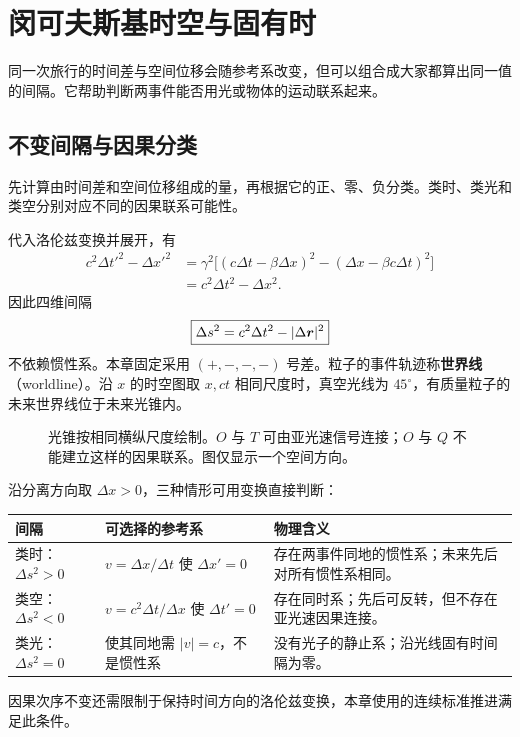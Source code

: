 \section{闵可夫斯基时空与固有时}
同一次旅行的时间差与空间位移会随参考系改变，但可以组合成大家都算出同一值的间隔。它帮助判断两事件能否用光或物体的运动联系起来。

\subsection{不变间隔与因果分类}
先计算由时间差和空间位移组成的量，再根据它的正、零、负分类。类时、类光和类空分别对应不同的因果联系可能性。

代入洛伦兹变换并展开，有
\[
\begin{aligned}
c^2\Delta t'^2-\Delta x'^2
&=\gamma^2\big[(c\Delta t-\beta\Delta x)^2-(\Delta x-\beta c\Delta t)^2\big]\\
&=c^2\Delta t^2-\Delta x^2.
\end{aligned}
\]
因此四维间隔
\begin{equation}\label{eq:sr-interval}
\boxed{\Delta s^2=c^2\Delta t^2-|\Delta\boldsymbol{r}|^2}
\end{equation}
不依赖惯性系。本章固定采用 $(+,-,-,-)$ 号差。粒子的事件轨迹称\textbf{世界线}（worldline）。沿 $x$ 的时空图取 $x,ct$ 相同尺度时，真空光线为 $45^\circ$，有质量粒子的未来世界线位于未来光锥内。

\begin{figure}[htbp]\centering
{}
\caption{光锥按相同横纵尺度绘制。$O$ 与 $T$ 可由亚光速信号连接；$O$ 与 $Q$ 不能建立这样的因果联系。图仅显示一个空间方向。}\label{fig:sr-cone}
\end{figure}

沿分离方向取 $\Delta x>0$，三种情形可用变换直接判断：
\begin{center}\begin{tabular}{p{3.1cm}p{4.1cm}p{6cm}}\toprule
间隔&可选择的参考系&物理含义\\\midrule
类时：$\Delta s^2>0$&$v=\Delta x/\Delta t$ 使 $\Delta x'=0$&存在两事件同地的惯性系；未来先后对所有惯性系相同。\\
类空：$\Delta s^2<0$&$v=c^2\Delta t/\Delta x$ 使 $\Delta t'=0$&存在同时系；先后可反转，但不存在亚光速因果连接。\\
类光：$\Delta s^2=0$&使其同地需 $|v|=c$，不是惯性系&没有光子的静止系；沿光线固有时间隔为零。\\\bottomrule
\end{tabular}\end{center}
因果次序不变还需限制于保持时间方向的洛伦兹变换，本章使用的连续标准推进满足此条件。

